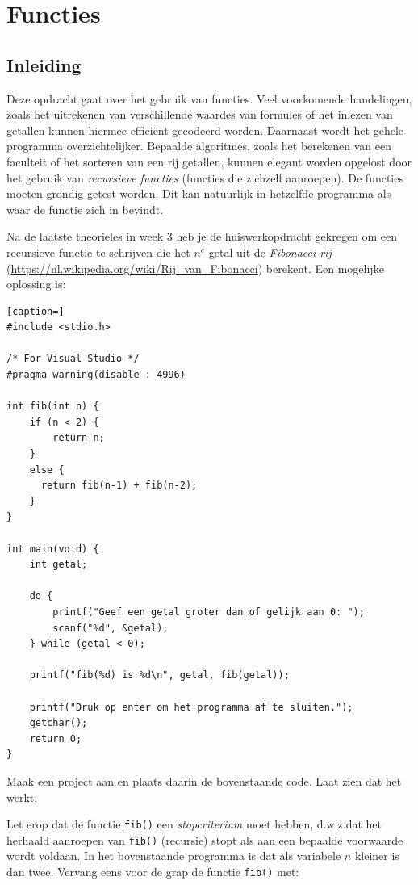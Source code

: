 \documentclass[a4paper,10pt,fleqn,twoside]{article}
\begin{document}
\section{Functies}

\subsection{Inleiding}
Deze opdracht gaat over het gebruik van functies. Veel voorkomende handelingen, zoals het uitrekenen van verschillende waardes van formules of het inlezen van getallen kunnen hiermee efficiënt gecodeerd worden. Daarnaast wordt het gehele programma overzichtelijker. Bepaalde algoritmes, zoals het berekenen van een faculteit of het sorteren van een rij getallen, kunnen elegant worden opgelost door het gebruik van \textsl{recursieve functies} (functies die zichzelf aanroepen). De functies moeten grondig getest worden. Dit kan natuurlijk in hetzelfde programma als waar de functie zich in bevindt.

Na de laatste theorieles in week 3 heb je de huiswerkopdracht gekregen om een recursieve functie te schrijven die het $n^e$ getal uit de \textsl{Fibonacci-rij} (\url{https://nl.wikipedia.org/wiki/Rij_van_Fibonacci}) berekent. Een mogelijke oplossing is:

\begin{lstlisting}[caption=]
#include <stdio.h>

/* For Visual Studio */
#pragma warning(disable : 4996)

int fib(int n) {
    if (n < 2) {
        return n;
	}
	else {
	  return fib(n-1) + fib(n-2);
	}
} 

int main(void) {
    int getal;

    do {
        printf("Geef een getal groter dan of gelijk aan 0: ");
        scanf("%d", &getal);
    } while (getal < 0);

    printf("fib(%d) is %d\n", getal, fib(getal));

    printf("Druk op enter om het programma af te sluiten.");
    getchar();
    return 0;
}
\end{lstlisting}

Maak een project aan en plaats daarin de bovenstaande code. Laat zien dat het werkt.

Let erop dat de functie \lstinline|fib()| een \textsl{stopcriterium} moet hebben, d.w.z.\@ dat het herhaald aanroepen van \lstinline|fib()| (recursie) stopt als aan een bepaalde voorwaarde wordt voldaan. In het bovenstaande programma is dat als variabele $n$ kleiner is dan twee. Vervang eens voor de grap de functie \lstinline|fib()| met:
\end{document}
